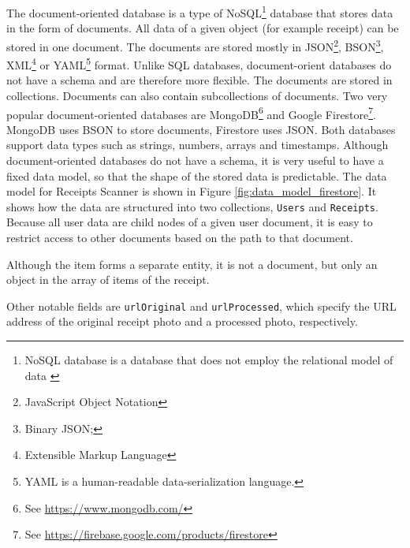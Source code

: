 \documentclass[
  digital, %
  table,   %
  oneside, %
  lof,     %
  lot,     %
]{fithesis3}
\begin{document}
The document-oriented database is a type of NoSQL\footnote{NoSQL database is a database that does not employ the relational model of data \cite{DigitalOcean2019}} database that stores data in the form of documents. All data of a given object (for example receipt) can be stored in one document. The documents are stored mostly in JSON\footnote{JavaScript Object Notation}, BSON\footnote{Binary JSON;}, XML\footnote{Extensible Markup Language} or YAML\footnote{YAML is a human-readable data-serialization language.} format. Unlike SQL databases, document-orient databases do not have a schema and are therefore more flexible. 
The documents are stored in collections. Documents can also contain subcollections of documents.
Two very popular document-oriented databases are MongoDB\footnote{See \url{https://www.mongodb.com/}} and Google Firestore\footnote{See \url{https://firebase.google.com/products/firestore}}. MongoDB uses BSON to store documents, Firestore uses JSON. Both databases support data types such as strings, numbers, arrays and timestamps. 
Although document-oriented databases do not have a schema, it is very useful to have a fixed data model, so that the shape of the stored data is predictable. 
The data model for Receipts Scanner is shown in Figure \ref{fig:data_model_firestore}. It shows how the data are structured into two collections, \texttt{Users} and \texttt{Receipts}. Because all user data are child nodes of a given user document, it is easy to restrict access to other documents based on the path to that document.

Although the item forms a separate entity, it is not a document, but only an object in the array of items of the receipt.

Other notable fields are \texttt{urlOriginal} and \texttt{urlProcessed}, which specify the URL address of the original receipt photo and a processed photo, respectively. 
\end{document}

